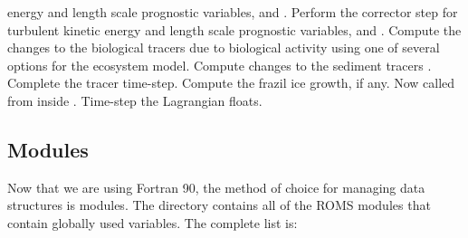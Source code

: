 \begin{klist}
  energy and length scale prognostic variables,  and 
  \citep{Mellor82, Galperin88}.
   Perform the corrector step for turbulent kinetic
  energy and length scale prognostic variables,  and 
  \citep{Umlauf2003, Warner_2005}.
   Compute the changes to the biological tracers due to
  biological activity using one of several options for the ecosystem
  model.
   Compute changes to the sediment tracers
  \citep{Warner_2008}.
   Complete the tracer time-step.
   Compute the frazil ice growth, if any. Now called
  from inside .
   Time-step the Lagrangian floats.
\end{klist}

\subsection{Modules}
\label{Mod_f90}
Now that we are using Fortran 90, the method of choice for managing
data structures is modules. The  directory
contains all of the ROMS modules that contain globally used
variables. The complete list is:
